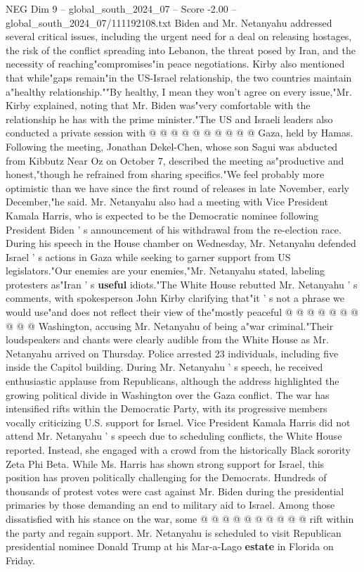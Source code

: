 \begin{textsample}{NEG Dim 9 – global\_south\_2024\_07 – Score -2.00 – global\_south\_2024\_07/111192108.txt}
Biden and Mr.
Netanyahu addressed several critical issues, including the urgent need for a deal on releasing hostages, the risk of the conflict spreading into Lebanon, the threat posed by Iran, and the necessity of reaching"compromises"in peace negotiations.
Kirby also mentioned that while"gaps remain"in the US-Israel relationship, the two countries maintain a"healthy relationship.""By healthy, I mean they won't agree on every issue,"Mr.
Kirby explained, noting that Mr.
Biden was"very comfortable with the relationship he has with the prime minister."The US and Israeli leaders also conducted a private session with @ @ @ @ @ @ @ @ @ @ Gaza, held by Hamas.
Following the meeting, Jonathan Dekel-Chen, whose son Sagui was abducted from Kibbutz Near Oz on October 7, described the meeting as"productive and honest,"though he refrained from sharing specifics."We feel probably more optimistic than we have since the first round of releases in late November, early December,"he said.
Mr.
Netanyahu also had a meeting with Vice President Kamala Harris, who is expected to be the Democratic nominee following President Biden ' s announcement of his withdrawal from the re-election race.
During his speech in the House chamber on Wednesday, Mr.
Netanyahu defended Israel ' s actions in Gaza while seeking to garner support from US legislators."Our enemies are your enemies,"Mr.
Netanyahu stated, labeling protesters as"Iran ' s \textbf{useful} idiots."The White House rebutted Mr.
Netanyahu ' s comments, with spokesperson John Kirby clarifying that"it ' s not a phrase we would use"and does not reflect their view of the"mostly peaceful @ @ @ @ @ @ @ @ @ @ Washington, accusing Mr.
Netanyahu of being a"war criminal."Their loudspeakers and chants were clearly audible from the White House as Mr.
Netanyahu arrived on Thursday.
Police arrested 23 individuals, including five inside the Capitol building.
During Mr.
Netanyahu ' s speech, he received enthusiastic applause from Republicans, although the address highlighted the growing political divide in Washington over the Gaza conflict.
The war has intensified rifts within the Democratic Party, with its progressive members vocally criticizing U.S. support for Israel.
Vice President Kamala Harris did not attend Mr.
Netanyahu ' s speech due to scheduling conflicts, the White House reported.
Instead, she engaged with a crowd from the historically Black sorority Zeta Phi Beta.
While Ms.
Harris has shown strong support for Israel, this position has proven politically challenging for the Democrats.
Hundreds of thousands of protest votes were cast against Mr.
Biden during the presidential primaries by those demanding an end to military aid to Israel.
Among those dissatisfied with his stance on the war, some @ @ @ @ @ @ @ @ @ @ rift within the party and regain support.
Mr.
Netanyahu is scheduled to visit Republican presidential nominee Donald Trump at his Mar-a-Lago \textbf{estate} in Florida on Friday.

\end{textsample}
